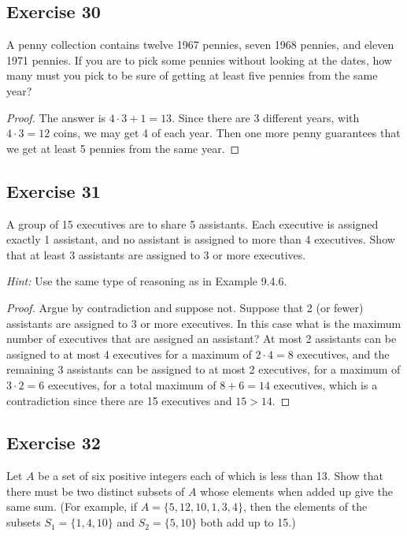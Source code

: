 \documentclass[14pt]{extarticle}
\begin{document}
\subsection{Exercise 30}
A penny collection contains twelve 1967 pennies, seven 1968 pennies, and eleven 1971 pennies. If you are to pick some
pennies without looking at the dates, how many must you pick to be sure of getting at least five pennies from the
same year?

\begin{proof}
     The answer is \(4 \cdot 3 + 1 = 13\). Since there are 3 different years, with \(4 \cdot 3 = 12\) coins, we may get
     4 of each year. Then one more penny guarantees that we get at least 5 pennies from the same year.
\end{proof}

\subsection{Exercise 31}
A group of 15 executives are to share 5 assistants. Each executive is assigned exactly 1 assistant, and no assistant
is assigned to more than 4 executives. Show that at least 3 assistants are assigned to 3 or more executives.

     {\it Hint:} Use the same type of reasoning as in Example 9.4.6.

\begin{proof}
     Argue by contradiction and suppose not. Suppose that 2 (or fewer) assistants are assigned to 3 or more executives.
     In this case what is the maximum number of executives that are assigned an assistant? At most 2 assistants can be
     assigned to at most 4 executives for a maximum of \(2 \cdot 4 = 8\) executives, and the remaining 3 assistants can be
     assigned to at most 2 executives, for a maximum of \(3 \cdot 2 = 6\) executives, for a total maximum of \(8+6=14\)
     executives, which is a contradiction since there are 15 executives and \(15 > 14\).
\end{proof}

\subsection{Exercise 32}
Let \(A\) be a set of six positive integers each of which is less than 13. Show that there must be two distinct
subsets of \(A\) whose elements when added up give the same sum. (For example, if \(A = \{5, 12, 10, 1, 3, 4\}\), then
the elements of the subsets \(S_1 = \{1, 4, 10\}\) and \(S_2 = \{5, 10\}\) both add up to 15.)
\end{document}
